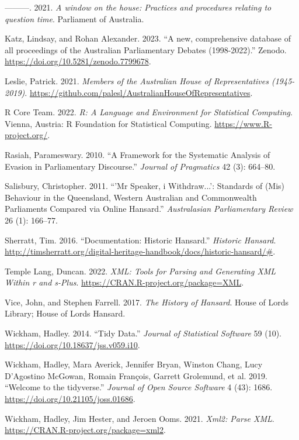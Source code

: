 \documentclass[
  letterpaper,
  DIV=11,
  numbers=noendperiod]{scrartcl}
\newlength{\cslhangindent}
\newlength{\cslentryspacingunit} %
\newenvironment{CSLReferences}[2] %
 {%
  \setlength{\parindent}{0pt}
  \ifodd #1
  \let\oldpar\par
  \def\par{\hangindent=\cslhangindent\oldpar}
  \fi
  \setlength{\parskip}{#2\cslentryspacingunit}
 }%
 {}
\begin{document}
\begin{CSLReferences}{1}{0}
\leavevmode{}%
---------. 2021. \emph{{A window on the house: Practices and procedures
relating to question time}}. {Parliament of Australia}.

\leavevmode{}%
Katz, Lindsay, and Rohan Alexander. 2023. {``{A new, comprehensive
database of all proceedings of the Australian Parliamentary Debates
(1998-2022)}.''} Zenodo. \url{https://doi.org/10.5281/zenodo.7799678}.

\leavevmode{}%
Leslie, Patrick. 2021. \emph{Members of the Australian House of
Representatives (1945-2019)}.
\url{https://github.com/palesl/AustralianHouseOfRepresentatives}.

\leavevmode{}%
R Core Team. 2022. \emph{R: A Language and Environment for Statistical
Computing}. Vienna, Austria: R Foundation for Statistical Computing.
\url{https://www.R-project.org/}.

\leavevmode{}%
Rasiah, Parameswary. 2010. {``A Framework for the Systematic Analysis of
Evasion in Parliamentary Discourse.''} \emph{Journal of Pragmatics} 42
(3): 664--80.

\leavevmode{}%
Salisbury, Christopher. 2011. {``'Mr Speaker, i Withdraw...': Standards
of (Mis) Behaviour in the Queensland, Western Australian and
Commonwealth Parliaments Compared via Online Hansard.''}
\emph{Australasian Parliamentary Review} 26 (1): 166--77.

\leavevmode{}%
Sherratt, Tim. 2016. {``Documentation: Historic Hansard.''}
\emph{Historic Hansard}.
\url{http://timsherratt.org/digital-heritage-handbook/docs/historic-hansard/\#}.

\leavevmode{}%
Temple Lang, Duncan. 2022. \emph{XML: Tools for Parsing and Generating
XML Within r and s-Plus}. \url{https://CRAN.R-project.org/package=XML}.

\leavevmode{}%
Vice, John, and Stephen Farrell. 2017. \emph{The History of Hansard}.
House of Lords Library; House of Lords Hansard.

\leavevmode{}%
Wickham, Hadley. 2014. {``Tidy Data.''} \emph{Journal of Statistical
Software} 59 (10). \url{https://doi.org/10.18637/jss.v059.i10}.

\leavevmode{}%
Wickham, Hadley, Mara Averick, Jennifer Bryan, Winston Chang, Lucy
D'Agostino McGowan, Romain François, Garrett Grolemund, et al. 2019.
{``Welcome to the {tidyverse}.''} \emph{Journal of Open Source Software}
4 (43): 1686. \url{https://doi.org/10.21105/joss.01686}.

\leavevmode{}%
Wickham, Hadley, Jim Hester, and Jeroen Ooms. 2021. \emph{Xml2: Parse
XML}. \url{https://CRAN.R-project.org/package=xml2}.

\end{CSLReferences}
\end{document}
